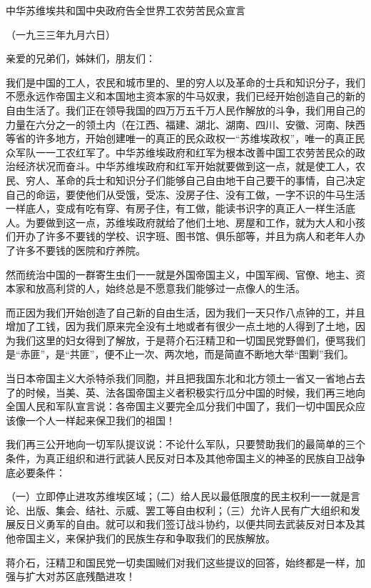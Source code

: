 中华苏维埃共和国中央政府告全世界工农劳苦民众宣言

（一九三三年九月六日）



亲爱的兄弟们，姊妹们，朋友们：

我们是中国的工人，农民和城市里的、里的穷人以及革命的士兵和知识分子，我们不愿永远作帝国主义和本国地主资本家的牛马奴隶，我们已经开始创造自己的新的自由生活了。我们正在领导我国的四万万五千万人民作解放的斗争，我们用自己的力量在六分之一的领土内（在江西、福建、湖北、湖南、四川、安徽、河南、陕西等省的许多地方，开始创建唯一的真正的民众政权一“苏维埃政权”，唯一的真正民众军队一一工农红军了。中华苏维埃政府和红军为根本改善中国工农劳苦民众的政治经济状况而奋斗。中华苏维埃政府和红军开始就要做到这一点，就是使工人，农民、穷人、革命的兵士和知识分子们能够自己自由地干自己要干的事情，自己决定自己的命运，要使他们从受饿，受冻、没房子住、没有工做，一字不识的牛马生活一样底人，变成有吃有穿、有房子住，有工做，能读书识字的真正人一样生活底人。为要做到这一点，苏维埃政府就给了他们土地、房屋和工作，就为大人和小孩们开办了许多不要钱的学校、识字班、图书馆、俱乐部等，并且为病人和老年人办了许多不要钱的医院和疗养院。

然而统治中国的一群寄生虫们一一就是外国帝国主义，中国军阀、官僚、地主、资本家和放高利贷的人，始终总是不愿意我们能够过一点像人的生活。

而正因为我们开始创造了自己新的自由生活，因为我们一天只作八点钟的工，并且增加了工钱，因为我们原来完全没有土地或者有很少一点土地的人得到了土地，因为我们这里的妇女得到了解放，于是蒋介石汪精卫和一切国民党野兽们，便骂我们是“赤匪”，是“共匪”，便不止一次、两次地，而是简直不断地大举“围剿”我们。

当日本帝国主义大杀特杀我们同胞，并且把我国东北和北方领土一省又一省地占去了的时候，当美、英、法各国帝国主义者积极实行瓜分中国的时候，我们再三地向全国人民和军队宣言说：各帝国主义要完全瓜分我们中国了，我们一切中国民众应该像一个人一样起来保卫我们的祖国！

我们再三公开地向一切军队提议说：不论什么军队，只要赞助我们的最简单的三个条件，为真正组织和进行武装人民反对日本及其他帝国主义的神圣的民族自卫战争底必要条件：

（一）立即停止进攻苏维埃区域；（二）给人民以最低限度的民主权利一一就是言论、出版、集会、结社、示威、罢工等自由权利；（三）允许人民有广大组织和发展反日义勇军的自由。就可以和我们签订战斗协约，以便共同去武装反对日本及其他帝国主义，来保护我们的民族生存和争取我们的民族解放。

蒋介石，汪精卫和国民党一切卖国贼们对我们这些提议的回答，始终都是一样，加强与扩大对苏区底残酷进攻！


